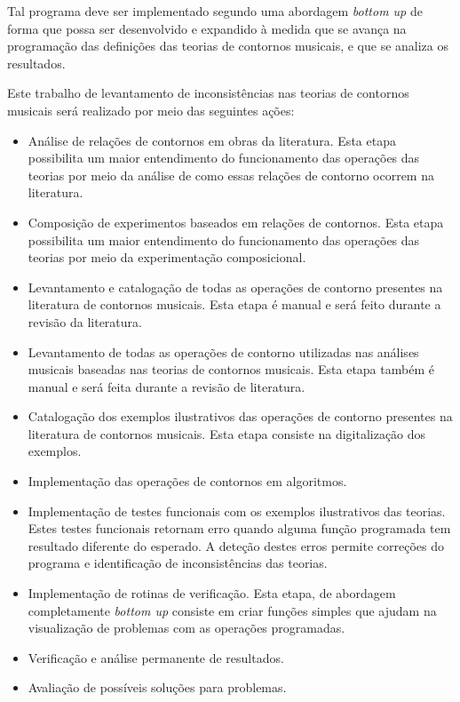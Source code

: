 \documentclass[12pt]{article}
\newcommand{\eng}[1]{\textit{#1}}
\begin{document}
Tal programa deve ser implementado segundo uma abordagem \eng{bottom
  up} \cite{graham94:lisp} de forma que possa ser desenvolvido e
expandido à medida que se avança na programação das definições das
teorias de contornos musicais, e que se analiza os resultados.

Este trabalho de levantamento de inconsistências nas teorias de
contornos musicais será realizado por meio das seguintes ações:

\begin{itemize}
\item Análise de relações de contornos em obras da literatura. Esta
  etapa possibilita um maior entendimento do funcionamento das
  operações das teorias por meio da análise de como essas relações de
  contorno ocorrem na literatura.
\item Composição de experimentos baseados em relações de contornos.
  Esta etapa possibilita um maior entendimento do funcionamento das
  operações das teorias por meio da experimentação composicional.
\item Levantamento e catalogação de todas as operações de contorno
  presentes na literatura de contornos musicais. Esta etapa é manual e
  será feito durante a revisão da literatura.
\item Levantamento de todas as operações de contorno utilizadas nas
  análises musicais baseadas nas teorias de contornos musicais. Esta
  etapa também é manual e será feita durante a revisão de literatura.
\item Catalogação dos exemplos ilustrativos das operações de contorno
  presentes na literatura de contornos musicais. Esta etapa consiste
  na digitalização dos exemplos.
\item Implementação das operações de contornos em algoritmos.
\item Implementação de testes funcionais com os exemplos ilustrativos
  das teorias. Estes testes funcionais retornam erro quando alguma
  função programada tem resultado diferente do esperado. A deteção
  destes erros permite correções do programa e identificação de
  inconsistências das teorias.
\item Implementação de rotinas de verificação. Esta etapa, de
  abordagem completamente \eng{bottom up} consiste em criar funções
  simples que ajudam na visualização de problemas com as operações
  programadas.
\item Verificação e análise permanente de resultados.
\item Avaliação de possíveis soluções para problemas.
\end{itemize}
\end{document}
